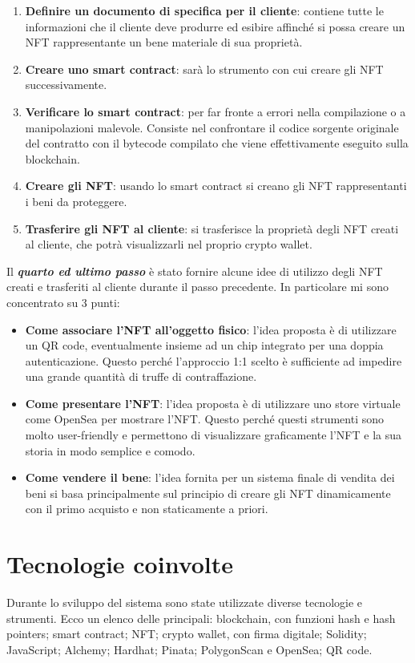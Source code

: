\documentclass[a4paper, 12pt, italian]{extarticle}
\begin{document}
\begin{enumerate}[topsep=5pt, itemsep=0pt]
    \item \textbf{Definire un documento di specifica per il cliente}: contiene tutte le informazioni che il cliente deve produrre ed esibire affinché si possa creare un NFT rappresentante un bene materiale di sua proprietà.
    \item \textbf{Creare uno smart contract}: sarà lo strumento con cui creare gli NFT successivamente.
    \item \textbf{Verificare lo smart contract}: per far fronte a errori nella compilazione o a manipolazioni malevole. Consiste nel confrontare il codice sorgente originale del contratto con il bytecode compilato che viene effettivamente eseguito sulla blockchain.
    \item \textbf{Creare gli NFT}: usando lo smart contract si creano gli NFT rappresentanti i beni da proteggere.
    \item \textbf{Trasferire gli NFT al cliente}: si trasferisce la proprietà degli NFT creati al cliente, che potrà visualizzarli nel proprio crypto wallet.\newline
\end{enumerate}
Il \textbf{\textit{quarto ed ultimo passo}} è stato fornire alcune idee di utilizzo degli NFT creati e trasferiti al cliente durante il passo precedente.\newline
In particolare mi sono concentrato su 3 punti:
\begin{itemize}[topsep=5pt, itemsep=0pt]
    \item \textbf{Come associare l'NFT all'oggetto fisico}: l'idea proposta è di utilizzare un QR code, eventualmente insieme ad un chip integrato per una doppia autenticazione. Questo perché l'approccio 1:1 scelto è sufficiente ad impedire una grande quantità di truffe di contraffazione.
    \item \textbf{Come presentare l'NFT}: l'idea proposta è di utilizzare uno store virtuale come OpenSea per mostrare l'NFT. Questo perché questi strumenti sono molto user-friendly e permettono di visualizzare graficamente l'NFT e la sua storia in modo semplice e comodo.
    \item \textbf{Come vendere il bene}: l'idea fornita per un sistema finale di vendita dei beni si basa principalmente sul principio di creare gli NFT dinamicamente con il primo acquisto e non staticamente a priori.
\end{itemize}

\section{Tecnologie coinvolte}
Durante lo sviluppo del sistema sono state utilizzate diverse tecnologie e strumenti.\newline
Ecco un elenco delle principali: blockchain, con funzioni hash e hash pointers; smart contract; NFT; crypto wallet, con firma digitale; Solidity; JavaScript; Alchemy; Hardhat; Pinata; PolygonScan e OpenSea; QR code.
\end{document}
